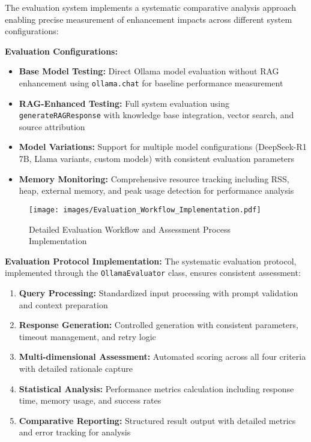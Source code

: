 The evaluation system implements a systematic comparative analysis approach enabling precise measurement of enhancement impacts across different system configurations:

\textbf{Evaluation Configurations:}
\begin{itemize}
    \item \textbf{Base Model Testing:} Direct Ollama model evaluation without RAG enhancement using \texttt{ollama.chat} for baseline performance measurement
    \item \textbf{RAG-Enhanced Testing:} Full system evaluation using \texttt{generateRAGResponse} with knowledge base integration, vector search, and source attribution
    \item \textbf{Model Variations:} Support for multiple model configurations (DeepSeek-R1 7B, Llama variants, custom models) with consistent evaluation parameters
    \item \textbf{Memory Monitoring:} Comprehensive resource tracking including RSS, heap, external memory, and peak usage detection for performance analysis
\end{itemize}

\begin{figure}[H]
\centering
\texttt{[image: images/Evaluation\_Workflow\_Implementation.pdf]}
\caption{Detailed Evaluation Workflow and Assessment Process Implementation}
\label{fig:evaluation_workflow_s3}
\end{figure}

\textbf{Evaluation Protocol Implementation:}
The systematic evaluation protocol, implemented through the \texttt{OllamaEvaluator} class, ensures consistent assessment:

\begin{enumerate}
    \item \textbf{Query Processing:} Standardized input processing with prompt validation and context preparation
    \item \textbf{Response Generation:} Controlled generation with consistent parameters, timeout management, and retry logic
    \item \textbf{Multi-dimensional Assessment:} Automated scoring across all four criteria with detailed rationale capture
    \item \textbf{Statistical Analysis:} Performance metrics calculation including response time, memory usage, and success rates
    \item \textbf{Comparative Reporting:} Structured result output with detailed metrics and error tracking for analysis
\end{enumerate}

